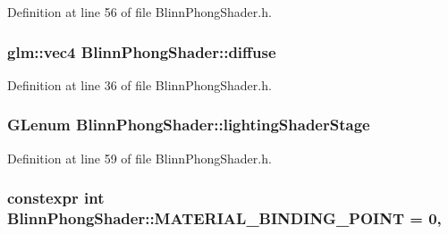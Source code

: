 Definition at line 56 of file Blinn\+Phong\+Shader.\+h.

\hypertarget{class_blinn_phong_shader_ae74d0446ec1a871ca57caf002f52e20c}{}
\subsubsection[{diffuse}]{\setlength{\rightskip}{0pt plus 5cm}glm\+::vec4 Blinn\+Phong\+Shader\+::diffuse\hspace{0.3cm}{\ttfamily [protected]}}\label{class_blinn_phong_shader_ae74d0446ec1a871ca57caf002f52e20c}


Definition at line 36 of file Blinn\+Phong\+Shader.\+h.

\hypertarget{class_blinn_phong_shader_a942775771a09fd5553409bdb44ec32ac}{}
\subsubsection[{lighting\+Shader\+Stage}]{\setlength{\rightskip}{0pt plus 5cm}G\+Lenum Blinn\+Phong\+Shader\+::lighting\+Shader\+Stage\hspace{0.3cm}{\ttfamily [private]}}\label{class_blinn_phong_shader_a942775771a09fd5553409bdb44ec32ac}


Definition at line 59 of file Blinn\+Phong\+Shader.\+h.

\hypertarget{class_blinn_phong_shader_a8c2a0ab9a26c0369ae3b45d5c9bd8f6b}{}
\subsubsection[{M\+A\+T\+E\+R\+I\+A\+L\+\_\+\+B\+I\+N\+D\+I\+N\+G\+\_\+\+P\+O\+I\+N\+T}]{\setlength{\rightskip}{0pt plus 5cm}constexpr int Blinn\+Phong\+Shader\+::\+M\+A\+T\+E\+R\+I\+A\+L\+\_\+\+B\+I\+N\+D\+I\+N\+G\+\_\+\+P\+O\+I\+N\+T = 0\hspace{0.3cm}{\ttfamily [static]}, {\ttfamily [protected]}}\label{class_blinn_phong_shader_a8c2a0ab9a26c0369ae3b45d5c9bd8f6b}


